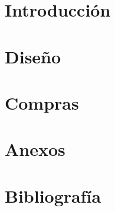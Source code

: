 \documentclass[12pt,oneside,final]{rf2}
\begin{document}





\newpage
{}

\tableofcontents

\listoffigures

\listoftables
\newpage
\startarabicpagination

\part{Introducción}


\part{Diseño}




\part{Compras}



\part{Anexos}
\appendix
%

\part{Bibliografía}
%
%
\end{document}

